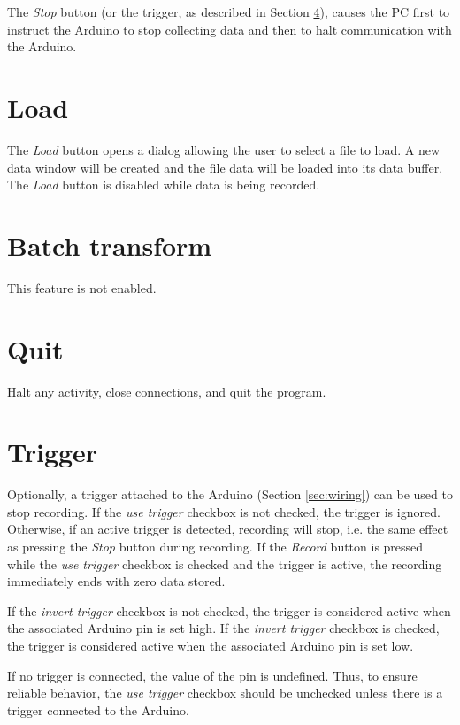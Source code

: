 \documentclass[11pt,letterpaper,article,oneside]{memoir}
\begin{document}
The \emph{Stop} button (or the trigger, as described in Section \ref{sec:trigger}),
causes the PC first to instruct the Arduino to stop collecting data and then to
halt communication with the Arduino.


\section{Load}

The \emph{Load} button opens a dialog allowing the user to select a file to
load. A new data window will be created and the file data will be loaded into
its data buffer.  The \emph{Load} button is disabled while data is being
recorded.


\section{Batch transform}

This feature is not enabled.


\section{Quit}

Halt any activity, close connections, and quit the program.


\section{Trigger}
\label{sec:trigger}

Optionally, a trigger attached to the Arduino (Section \ref{sec:wiring}) can be
used to stop recording.  If the \emph{use trigger} checkbox is not checked, the
trigger is ignored. Otherwise, if an active trigger is detected, recording will
stop, i.e. the same effect as pressing the \emph{Stop} button during recording.
If the \emph{Record} button is pressed while the \emph{use trigger} checkbox is
checked and the trigger is active, the recording immediately ends with zero data
stored.

If the \emph{invert trigger} checkbox is not checked, the trigger is considered
active when the associated Arduino pin is set high. If the \emph{invert trigger}
checkbox is checked, the trigger is considered active when the associated
Arduino pin is set low.

If no trigger is connected, the value of the pin is undefined.  Thus, to ensure
reliable behavior, the \emph{use trigger} checkbox should be unchecked unless
there is a trigger connected to the Arduino.
\end{document}
